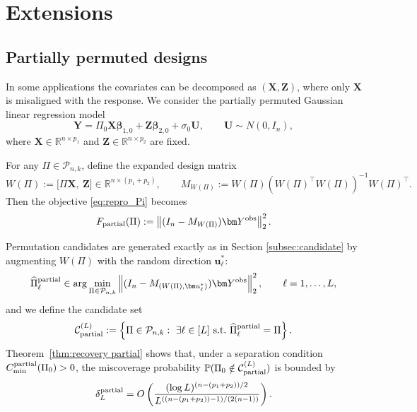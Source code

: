 \documentclass[11pt, reqno]{amsart}
\newcommand{\bP}{\mathbb{P}}
\newcommand{\mP}{\mathcal{P}}
\newcommand{\1}{\mbox{1}\hspace{-0.25em}\mbox{l}}
\newcommand{\obs}{\mathrm{obs}}
\theoremstyle{definition}\newtheorem{problem}{Problem}[section]
\theoremstyle{definition}\newtheorem{definition}[problem]{Definition}
\theoremstyle{remark}\newtheorem{assumption}{Assumption}
\theoremstyle{remark}\newtheorem{remark}[problem]{Remark}
\theoremstyle{definition}\newtheorem{example}[problem]{Example}
\theoremstyle{plain}\newtheorem{theorem}[problem]{Theorem}
\theoremstyle{plain}\newtheorem{question}[problem]{Question}
\theoremstyle{plain}\newtheorem{lemma}[problem]{Lemma}
\theoremstyle{plain}\newtheorem{proposition}[problem]{Proposition}
\theoremstyle{plain}\newtheorem{corollary}[problem]{Corollary}
\theoremstyle{plain}\newtheorem{conjecture}[problem]{Conjecture}
\begin{document}
\section{Extensions}\label{sec:extensions}

\subsection{Partially permuted designs}\label{subsec:partial-design}

In some applications the covariates can be decomposed as $(\bm X,\bm Z)$, where only $\bm X$ is
misaligned with the response.  We consider the partially permuted
Gaussian linear regression model
\begin{equation}\label{eq:model_partial}
\bm Y = \Pi_0 \bm X \bm\beta_{1,0} + \bm Z \bm\beta_{2,0} + \sigma_0 \bm U,
\qquad
\bm U\sim N(0,I_n),
\end{equation}
where $\bm X\in\mathbb R^{n\times p_1}$ and $\bm Z\in\mathbb R^{n\times p_2}$ are fixed.

For any $\Pi\in\mP_{n,k}$, define the expanded design matrix
\begin{equation}\label{eq:Wpartial-def}
W(\Pi):=\big[\Pi\bm X,\ \bm Z\big]\in\mathbb R^{n\times (p_1+p_2)},
\qquad
M_{W(\Pi)}:=W(\Pi)\left(W(\Pi)^\top W(\Pi)\right)^{-1}W(\Pi)^\top.
\end{equation}
Then the objective \eqref{eq:repro_Pi} becomes
\begin{equation}\label{eq:repro_Pi_partial}
F_{\rm partial}(\Pi):=\left\| (I_n-M_{W(\Pi)})\bm Y^{\obs}\right\|_2^2.
\end{equation}

Permutation candidates are generated exactly as in Section \ref{subsec:candidate}
by augmenting $W(\Pi)$ with the random direction $\bm u_\ell^*$:
\[
\widehat\Pi_{\ell}^{\rm partial}
\in \arg\min_{\Pi\in\mP_{n,k}}
\left\| (I_n - M_{(W(\Pi),\bm u_{\ell}^*)})\bm Y^{\obs}\right\|_2^2,
\qquad
\ell=1,\dots,L,
\]
and we define the candidate set
\begin{equation}\label{eq:perm-candset-partial}
\mathcal{C}_{\rm partial}^{(L)}
:=\left\{
\Pi\in\mP_{n,k}:\ \exists \ell\in[L]\ \text{s.t.}\ \widehat\Pi_{\ell}^{\rm partial}=\Pi
\right\}.
\end{equation}
Theorem~\ref{thm:recovery partial} shows that, under a
separation condition $C_{\min}^{\rm partial}(\Pi_0)>0$, the miscoverage probability
$\bP(\Pi_0\notin \mathcal{C}_{\rm partial}^{(L)})$ is bounded by
\[
\delta_L^{\rm partial}
=O\left(
\frac{(\log L)^{(n-(p_1+p_2))/2}}{L^{((n-(p_1+p_2))-1)/(2(n-1))}}
\right).
\]
\end{document}
